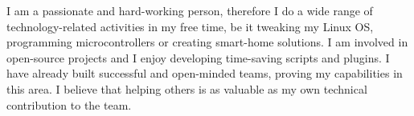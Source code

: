 \documentclass[11pt, a4paper]{awesome-cv}
\begin{document}
\makecvheader

\newline
I am a passionate and hard-working person, therefore I do a wide range of technology-related activities in my free time, be it tweaking my Linux OS, programming microcontrollers or creating smart-home solutions. I am involved in open-source projects and I enjoy developing time-saving scripts and plugins.
I have already built successful and open-minded teams, proving my capabilities in this area. I believe that helping others is as valuable as my own technical contribution to the team.



\vspace{20mm} %




\end{document}
